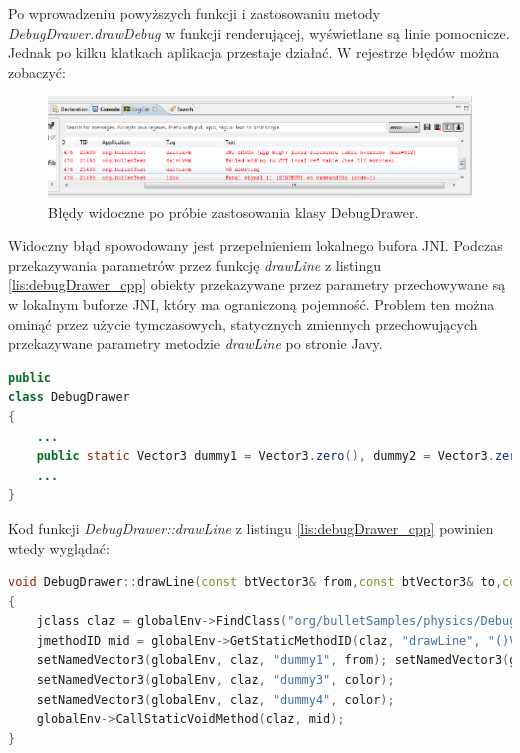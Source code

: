 Po wprowadzeniu powyższych funkcji i zastosowaniu metody
\emph{DebugDrawer.drawDebug} w funkcji renderującej, wyświetlane są linie
pomocnicze. Jednak po kilku klatkach aplikacja przestaje działać. W rejestrze
błędów można zobaczyć:

\begin{figure}
\centering
\includegraphics[scale = 0.6]{./img/logCat.PNG}
\caption{Błędy widoczne po próbie zastosowania klasy DebugDrawer.}
\label{fig:logCat}
\end{figure}

Widoczny błąd spowodowany jest przepełnieniem lokalnego bufora JNI. Podczas
przekazywania parametrów przez funkcję \emph{drawLine} z listingu
\ref{lis:debugDrawer_cpp} obiekty przekazywane przez parametry przechowywane są
w lokalnym buforze JNI, który ma ograniczoną pojemność. Problem ten można ominąć
przez użycie tymczasowych, statycznych zmiennych przechowujących przekazywane
parametry metodzie \emph{drawLine} po stronie Javy.

\begin{lstlisting}[language=Java,
caption=Tymczasowe zmienne przechowujące
parametry wywołania metody drawLine,label=lis:dummyVals] public
class DebugDrawer
{
	...
	public static Vector3 dummy1 = Vector3.zero(), dummy2 = Vector3.zero(), dummy3 = Vector3.zero(), dummy4 = Vector3.zero(); 
	...
}
\end{lstlisting}

Kod funkcji \emph{DebugDrawer::drawLine} z listingu \ref{lis:debugDrawer_cpp}
powinien wtedy wyglądać:

\begin{lstlisting}[language=C++,
caption=Implementacja metody drawLine
korzystającej z tymczasowych zmiennych,label=lis:drawLineDummyVals]
void DebugDrawer::drawLine(const btVector3& from,const btVector3& to,const btVector3& color)
{
	jclass claz = globalEnv->FindClass("org/bulletSamples/physics/DebugDrawer");
	jmethodID mid = globalEnv->GetStaticMethodID(claz, "drawLine", "()V");
	setNamedVector3(globalEnv, claz, "dummy1", from); setNamedVector3(globalEnv, claz, "dummy2", to); 
	setNamedVector3(globalEnv, claz, "dummy3", color);
	setNamedVector3(globalEnv, claz, "dummy4", color);
	globalEnv->CallStaticVoidMethod(claz, mid);
}
\end{lstlisting}


